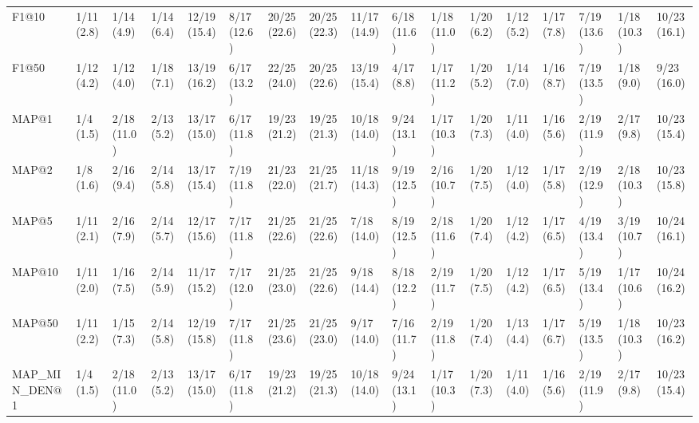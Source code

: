 \begin{tabular}{lllllllllllllllll}
F1@10                       &     1/11 (2.8) &     1/14 (4.9) &    1/14 (6.4) &   12/19 (15.4) &    8/17 (12.6) &      20/25 (22.6) &   20/25 (22.3) &  11/17 (14.9) &    6/18 (11.6) &  1/18 (11.0) &  1/20 (6.2) &     1/12 (5.2) &            1/17 (7.8) &         7/19 (13.6) &  1/18 (10.3) &  10/23 (16.1) \\
F1@50                       &     1/12 (4.2) &     1/12 (4.0) &    1/18 (7.1) &   13/19 (16.2) &    6/17 (13.2) &      22/25 (24.0) &   20/25 (22.6) &  13/19 (15.4) &     4/17 (8.8) &  1/17 (11.2) &  1/20 (5.2) &     1/14 (7.0) &            1/16 (8.7) &         7/19 (13.5) &   1/18 (9.0) &   9/23 (16.0) \\
MAP@1                       &      1/4 (1.5) &    2/18 (11.0) &    2/13 (5.2) &   13/17 (15.0) &    6/17 (11.8) &      19/23 (21.2) &   19/25 (21.3) &  10/18 (14.0) &    9/24 (13.1) &  1/17 (10.3) &  1/20 (7.3) &     1/11 (4.0) &            1/16 (5.6) &         2/19 (11.9) &   2/17 (9.8) &  10/23 (15.4) \\
MAP@2                       &      1/8 (1.6) &     2/16 (9.4) &    2/14 (5.8) &   13/17 (15.4) &    7/19 (11.8) &      21/23 (22.0) &   21/25 (21.7) &  11/18 (14.3) &    9/19 (12.5) &  2/16 (10.7) &  1/20 (7.5) &     1/12 (4.0) &            1/17 (5.8) &         2/19 (12.9) &  2/18 (10.3) &  10/23 (15.8) \\
MAP@5                       &     1/11 (2.1) &     2/16 (7.9) &    2/14 (5.7) &   12/17 (15.6) &    7/17 (11.8) &      21/25 (22.6) &   21/25 (22.6) &   7/18 (14.0) &    8/19 (12.5) &  2/18 (11.6) &  1/20 (7.4) &     1/12 (4.2) &            1/17 (6.5) &         4/19 (13.4) &  3/19 (10.7) &  10/24 (16.1) \\
MAP@10                      &     1/11 (2.0) &     1/16 (7.5) &    2/14 (5.9) &   11/17 (15.2) &    7/17 (12.0) &      21/25 (23.0) &   21/25 (22.6) &   9/18 (14.4) &    8/18 (12.2) &  2/19 (11.7) &  1/20 (7.5) &     1/12 (4.2) &            1/17 (6.5) &         5/19 (13.4) &  1/17 (10.6) &  10/24 (16.2) \\
MAP@50                      &     1/11 (2.2) &     1/15 (7.3) &    2/14 (5.8) &   12/19 (15.8) &    7/17 (11.8) &      21/25 (23.6) &   21/25 (23.0) &   9/17 (14.0) &    7/16 (11.7) &  2/19 (11.8) &  1/20 (7.4) &     1/13 (4.4) &            1/17 (6.7) &         5/19 (13.5) &  1/18 (10.3) &  10/23 (16.2) \\
MAP_MIN_DEN@1               &      1/4 (1.5) &    2/18 (11.0) &    2/13 (5.2) &   13/17 (15.0) &    6/17 (11.8) &      19/23 (21.2) &   19/25 (21.3) &  10/18 (14.0) &    9/24 (13.1) &  1/17 (10.3) &  1/20 (7.3) &     1/11 (4.0) &            1/16 (5.6) &         2/19 (11.9) &   2/17 (9.8) &  10/23 (15.4) \\

\end{tabular}
